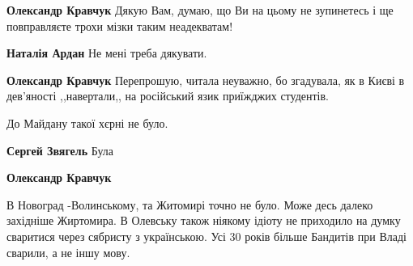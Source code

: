 \begin{itemize}
\begin{itemize}
\textbf{Олександр Кравчук} Дякую Вам, думаю, що Ви на цьому не зупинетесь і ще повправляєте трохи мізки таким неадекватам!

 
\textbf{Наталія Ардан} Не мені треба дякувати.

 
\textbf{Олександр Кравчук} Перепрошую, читала неуважно, бо згадувала, як в Києві в дев'яності ,,навертали,, на російський язик приїжджих студентів.
\end{itemize}

 
До Майдану такої хєрні не було.

\begin{itemize}
 
\textbf{Сергей Звягель} Була

 
\textbf{Олександр Кравчук} 

В Новоград -Волинському, та Житомирі точно не було. Може десь далеко західніше
Жиртомира. В Олевську також ніякому ідіоту не приходило на думку сваритися
через сябристу з українською. Усі 30 років більше Бандитів при Владі сварили, а
не іншу мову.


 


\end{itemize}
\end{itemize}
